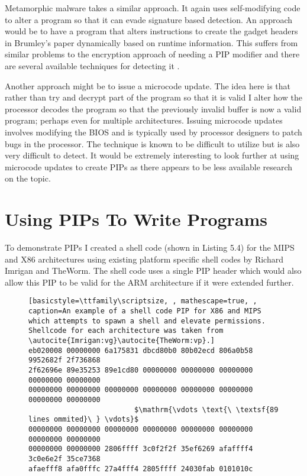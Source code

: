 \documentclass[10pt]{book}
\begin{document}
Metamorphic malware\autocite{Sikorski:2011ua} takes a similar approach.
It again uses self-modifying code to alter a program so that it can
evade signature based detection. An approach would be to have a program
that alters instructions to create the gadget headers in Brumley's
paper\autocite{Cha:2010uh} dynamically based on runtime information.
This suffers from similar problems to the encryption approach of needing
a PIP modifier and there are several available techniques for detecting
it \autocite{Han:2011iu}\autocite{Ali:2011do}.

Another approach might be to issue a microcode
update\autocite{Smotherman:2010wr}. The idea here is that rather than
try and decrypt part of the program so that it is valid I alter how the
processor decodes the program so that the previously invalid buffer is
now a valid program; perhaps even for multiple architectures. Issuing
microcode updates involves modifying the BIOS and is typically used by
processor designers to patch bugs in the processor. The technique is
known to be difficult to utilize\autocite{Skoudis:2004to} but is also
very difficult to detect. It would be extremely interesting to look
further at using microcode updates to create PIPs as there appears to be
less available research on the topic.

\section{Using PIPs To Write Programs}

To demonstrate PIPs I created a shell code (shown in Listing 5.4) for
the MIPS and X86 architectures using existing platform specific shell
codes by Richard Imrigan\autocite{Imrigan:vg} and
TheWorm\autocite{TheWorm:vp}. The shell code uses a single PIP header
which would also allow this PIP to be valid for the ARM architecture if
it were extended further.

\begin{figure}
\begin{lstlisting}[basicstyle=\ttfamily\scriptsize, , mathescape=true, ,
caption=An example of a shell code PIP for X86 and MIPS which attempts to spawn a shell and elevate permissions.  Shellcode for each architecture was taken from \autocite{Imrigan:vg}\autocite{TheWorm:vp}.]
eb020008 00000000 6a175831 dbcd80b0 80b02ecd 806a0b58 9952682f 2f736868
2f62696e 89e35253 89e1cd80 00000000 00000000 00000000 00000000 00000000
00000000 00000000 00000000 00000000 00000000 00000000 00000000 00000000
                         $\mathrm{\vdots \text{\ \textsf{89 lines ommited}\ } \vdots}$ 
00000000 00000000 00000000 00000000 00000000 00000000 00000000 00000000
00000000 00000000 2806ffff 3c0f2f2f 35ef6269 afaffff4 3c0e6e2f 35ce7368
afaefff8 afa0fffc 27a4fff4 2805ffff 24030fab 0101010c 
\end{lstlisting}
\end{figure}
\end{document}

